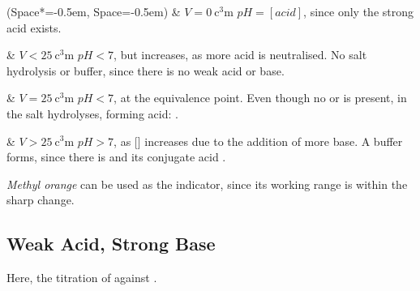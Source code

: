 			\begin{bulletlist}
				\ListProperties(Space*=-0.5em, Space=-0.5em)
				& $V = \SI{0}{\cubic\centi\metre}$
					\tabto{25mm}$pH = [acid]$, since only the strong acid exists.

				& $V < \SI{25}{\cubic\centi\metre}$
					\tabto{25mm}$pH < 7$, but increases, as more acid is neutralised.
					\tabto{25mm}No salt hydrolysis or buffer, since there is no weak acid or base.

				& $V = \SI{25}{\cubic\centi\metre}$
					\tabto{25mm}$pH < 7$, at the equivalence point.
					\tabto{25mm}Even though no  or  is present,  in the salt hydrolyses,
					\tabto{25mm}forming acid: .

				& $V > \SI{25}{\cubic\centi\metre}$
					\tabto{25mm}$pH > 7$, as [] increases due to the addition of more base.
					\tabto{25mm}A buffer forms, since there is  and its conjugate acid .

			\end{bulletlist}

			\textit{Methyl orange} can be used as the indicator, since its working range is within the sharp \pH{} change.




















		\pagebreak
		\subsection{Weak Acid, Strong Base}

			Here, the titration of  against .

